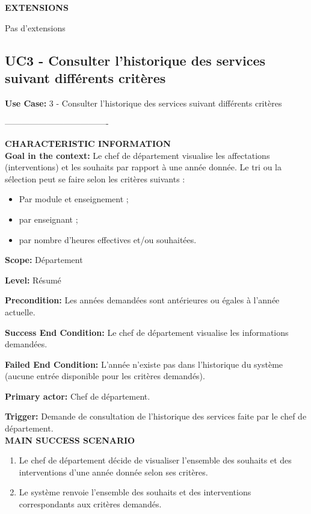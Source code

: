  \noindent\textbf{EXTENSIONS}
 \begin{list}{}{}
 \item Pas d'extensions\\
 \end{list}


 \subsection{UC3 - Consulter l'historique des services suivant différents critères}

 \noindent\textbf{Use Case:} 3 - Consulter l'historique des services suivant différents critères

 \noindent\--------------------------------------

 \noindent\textbf{CHARACTERISTIC INFORMATION}\\

 \noindent \textbf{Goal in the context:}
 Le chef de département visualise les affectations (interventions) et les souhaits par rapport à une année donnée. Le tri ou la sélection peut se faire selon les critères suivants :
 \begin{itemize}
 \item Par module et enseignement ;
 \item par enseignant ;
 \item par nombre d'heures effectives et/ou souhaitées.
 \end{itemize}

 \noindent\textbf{Scope:}
 Département

 \noindent\textbf{Level:}
 Résumé

 \noindent\textbf{Precondition:}
 Les années demandées sont antérieures ou égales à l'année actuelle.

 \noindent\textbf{Success End Condition:}
 Le chef de département visualise les informations demandées.

 \noindent\textbf{Failed End Condition:}
 L'année n'existe pas dans l'historique du système (aucune entrée disponible pour les critères demandés).

 \noindent\textbf{Primary actor:}
 Chef de département.

 \noindent\textbf{Trigger:}
 Demande de consultation de l'historique des services faite par le chef de département.\\

 
 \noindent\textbf{MAIN SUCCESS SCENARIO}
 \begin{enumerate}
 \item Le chef de département décide de visualiser l'ensemble des souhaits et des interventions d'une année donnée selon ses critères.
 \item Le système renvoie l'ensemble des souhaits et des interventions correspondants aux critères demandés.\\
 \end{enumerate}

